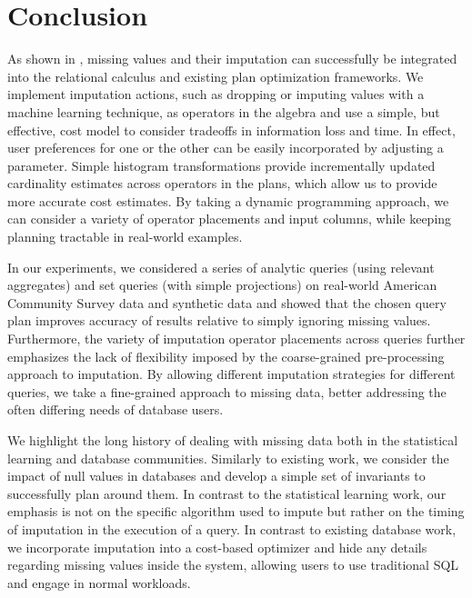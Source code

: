 \section{Conclusion}

As shown in \ProjectName{}, missing values and their imputation can successfully be integrated into the relational calculus and
existing plan optimization frameworks. We implement imputation actions, such as dropping or imputing values with a machine
learning technique, as operators in the algebra and use a simple, but effective, cost model to consider tradeoffs in 
information loss and time. In effect, user preferences for one or the other can be easily incorporated by adjusting a parameter.
Simple histogram transformations
provide incrementally updated cardinality estimates across operators in the plans, which allow us to provide more accurate cost estimates.
By taking a dynamic programming approach, we can consider a variety of operator placements
and input columns, while keeping planning tractable in real-world examples.

In our experiments, we considered a series of analytic queries (using relevant aggregates) and set queries (with simple projections) on real-world
American Community Survey data and synthetic data
and showed that the chosen query plan improves accuracy of results relative to simply ignoring missing values. Furthermore,
the variety of imputation operator placements across queries further emphasizes the lack of flexibility imposed by the coarse-grained
pre-processing approach to imputation. By allowing different imputation strategies for different queries, we
take a fine-grained approach to missing data, better addressing the often differing needs of database users.

We highlight the long history of dealing with missing data both in the statistical learning and database communities.
Similarly to existing work, we consider the impact of null values in databases and develop a simple set of invariants to 
successfully plan around them. In contrast to the statistical learning work, our emphasis is not on the specific algorithm
used to impute but rather on the timing of imputation in the execution of a query. In contrast to existing database work,
we incorporate imputation into a cost-based optimizer and hide any details
regarding missing values inside the system, allowing users to use traditional SQL and engage in normal workloads.

